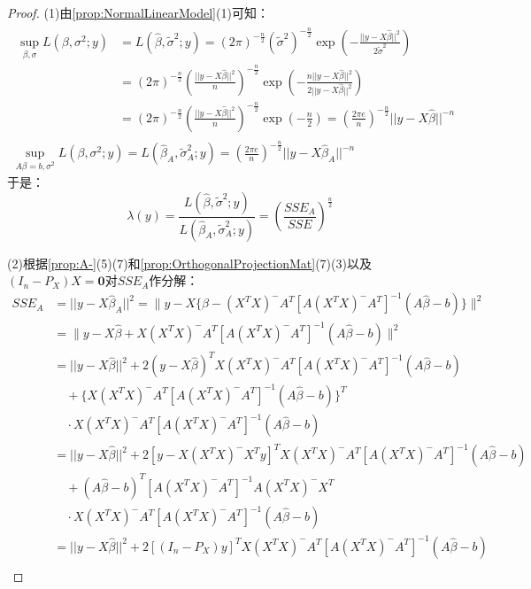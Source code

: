 \begin{proof}
	(1)由\cref{prop:NormalLinearModel}(1)可知：
	\begin{gather*}
		\begin{aligned}
			\sup_{\beta,\sigma}L(\beta,\sigma^2;y)&=L(\hat{\beta},\tilde{\sigma}^2;y)=(2\pi)^{-\frac{n}{2}}(\tilde{\sigma}^2)^{-\frac{n}{2}}\exp\left(-\frac{||y-X\hat{\beta}||^2}{2\tilde{\sigma}^2}\right) \\
			&=(2\pi)^{-\frac{n}{2}}\left(\frac{||y-X\hat{\beta}||^2}{n}\right)^{-\frac{n}{2}}\exp\left(-\frac{n||y-X\hat{\beta}||^2}{2||y-X\hat{\beta}||^2}\right) \\
			&=(2\pi)^{-\frac{n}{2}}\left(\frac{||y-X\hat{\beta}||^2}{n}\right)^{-\frac{n}{2}}\exp\left(-\frac{n}{2}\right)=\left(\frac{2\pi e}{n}\right)^{-\frac{n}{2}}||y-X\hat{\beta}||^{-n}
		\end{aligned} \\
		\sup_{A\beta=b,\sigma^2}L(\beta,\sigma^2;y)=L(\hat{\beta}_A,\tilde{\sigma}_A^2;y)=\left(\frac{2\pi e}{n}\right)^{-\frac{n}{2}}||y-X\hat{\beta}_A||^{-n}
	\end{gather*}
	于是：
	\begin{equation*}
		\lambda(y)=\frac{L(\hat{\beta},\tilde{\sigma}^2;y)}{L(\hat{\beta}_A,\tilde{\sigma}_A^2;y)}=\left(\frac{SSE_A}{SSE}\right)^\frac{n}{2}
	\end{equation*}\par
	(2)根据\cref{prop:A-}(5)(7)和\cref{prop:OrthogonalProjectionMat}(7)(3)以及$(I_n-P_X)X=\mathbf{0}$对$SSE_A$作分解：
	\begin{align*}
		SSE_A&=||y-X\hat{\beta}_A||^2=\Big\|y-X\{\hat{\beta}-(X^TX)^-A^T[A(X^TX)^-A^T]^{-1}(A\hat{\beta}-b)\}\Big\|^2 \\
		&=\Big\|y-X\hat{\beta}+X(X^TX)^-A^T[A(X^TX)^-A^T]^{-1}(A\hat{\beta}-b)\Big\|^2 \\
		&=||y-X\hat{\beta}||^2+2(y-X\hat{\beta})^TX(X^TX)^-A^T[A(X^TX)^-A^T]^{-1}(A\hat{\beta}-b) \\
		&\quad+\{X(X^TX)^-A^T[A(X^TX)^-A^T]^{-1}(A\hat{\beta}-b)\}^T \\
		&\quad\cdot X(X^TX)^-A^T[A(X^TX)^-A^T]^{-1}(A\hat{\beta}-b) \\
		&=||y-X\hat{\beta}||^2+2[y-X(X^TX)^-X^Ty]^TX(X^TX)^-A^T[A(X^TX)^-A^T]^{-1}(A\hat{\beta}-b) \\
		&\quad+(A\hat{\beta}-b)^T[A(X^TX)^-A^T]^{-1}A(X^TX)^-X^T \\
		&\quad\cdot X(X^TX)^-A^T[A(X^TX)^-A^T]^{-1}(A\hat{\beta}-b) \\
		&=||y-X\hat{\beta}||^2+2[(I_n-P_X)y]^TX(X^TX)^-A^T[A(X^TX)^-A^T]^{-1}(A\hat{\beta}-b) \\

\end{align*}
\end{proof}
